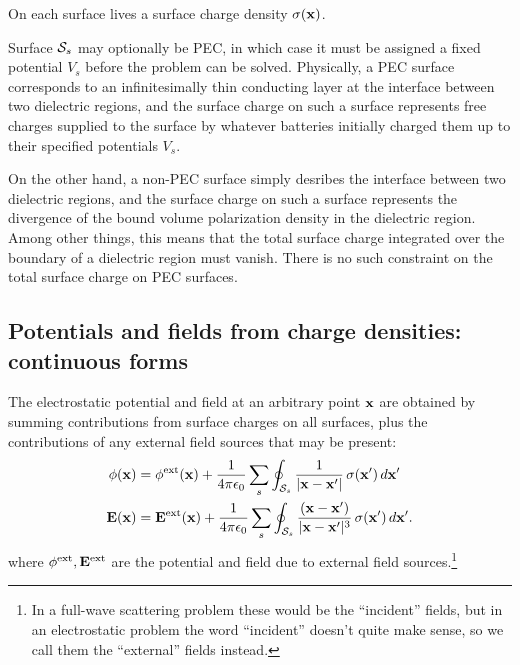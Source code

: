 \documentclass[letterpaper]{article}
\begin{document}
On each surface lives a surface charge density 
$\sigma(\mathbf{x})$.

Surface $\mathcal{S}_s$ may optionally be PEC, in which case it
must be assigned a fixed potential $V_s$ before the problem
can be solved. Physically, a PEC surface corresponds to
an infinitesimally thin conducting layer at the interface
between two dielectric regions, and the surface charge
on such a surface represents free charges supplied to the
surface by whatever batteries initially charged them up to
their specified  potentials $V_s.$

On the other hand, a non-PEC surface simply desribes the 
interface between two dielectric regions, and the 
surface charge on such a surface represents the divergence
of the bound volume polarization density in the dielectric  
region. Among other things, this means that the total
surface charge integrated over the boundary of a dielectric
region must vanish. There is no such constraint on 
the total surface charge on PEC surfaces.

\subsection*{Potentials and fields from charge densities: 
             continuous forms} 

The electrostatic potential and field at an arbitrary point
$\mathbf{x}$ are obtained by summing contributions from
surface charges on all surfaces, plus the contributions of
any external field sources that may be present:
\begin{subequations}
\begin{align}
\phi(\mathbf{x})  
&= \phi^{\hbox{\scriptsize{ext}}}(\mathbf{x}) 
  +\frac{1}{4\pi\epsilon_0} 
   \sum_{s} \oint_{\mathcal{S}_s}
   \frac{1}{|\mathbf{x} - \mathbf{x}^\prime|}
           \,\sigma(\mathbf{x}^\prime) \, d\mathbf{x}^\prime
\\
\mathbf{E}(\mathbf{x}) 
&= \mathbf{E}^{\hbox{\scriptsize{ext}}}(\mathbf{x})
  +\frac{1}{4\pi\epsilon_0}
   \sum_{s} \oint_{\mathcal{S}_s}
   \frac{(\mathbf{x}-\mathbf{x}^\prime)}
        {|\mathbf{x} - \mathbf{x}^\prime|^3}
        \,\sigma(\mathbf{x}^\prime)\,d\mathbf{x}^\prime.
\end{align}
\label{ContinuousEquations1}
\end{subequations}
\noindent 
where $\phi^{\hbox{\scriptsize{ext}}}, \mathbf{E}^{\hbox{\scriptsize{ext}}}$ are the potential and field 
due to external field sources.\footnote{In a full-wave scattering 
problem these would be the ``incident'' fields, but in an 
electrostatic problem the word ``incident'' doesn't quite make 
sense, so we call them the ``external'' fields instead.}
\end{document}
